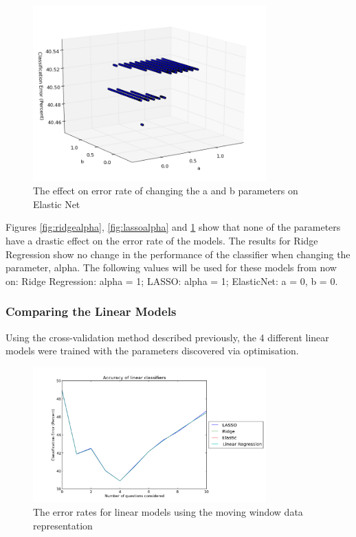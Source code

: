 \begin{figure}[h!]
\centering
\includegraphics[width=0.8\textwidth]{images/elasticnetab.png}
\caption{The effect on error rate of changing the a and b parameters on Elastic Net}
\label{fig:elasticnetab}
\end{figure}

Figures \ref{fig:ridgealpha}, \ref{fig:lassoalpha} and \ref{fig:elasticnetab} show that none of the parameters have a drastic effect on the error rate of the models. The results for Ridge Regression show no change in the performance of the classifier when changing the parameter, alpha. The following values will be used for these models from now on: Ridge Regression: alpha = 1; LASSO: alpha = 1; ElasticNet: a = 0, b = 0.

\subsubsection{Comparing the Linear Models}
Using the cross-validation method described previously, the 4 different linear models were trained with the parameters discovered via optimisation.

\begin{figure}[h!]
\centering
\includegraphics[width=0.8\textwidth]{images/linearmodelsmovingwindow.png}
\caption{The error rates for linear models using the moving window data representation}
\label{fig:linearmodelsmovingwindow}
\end{figure}

